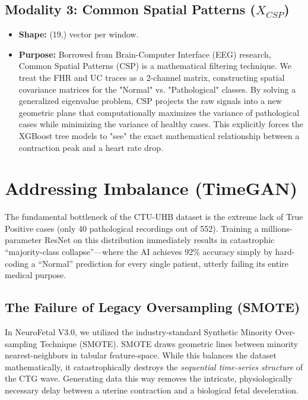 \documentclass[12pt,a4paper]{report}
\begin{document}
\section{Modality 3: Common Spatial Patterns ($X_{CSP}$)}
\begin{itemize}
    \item \textbf{Shape:} (19,) vector per window.
    \item \textbf{Purpose:} Borrowed from Brain-Computer Interface (EEG) research, Common Spatial Patterns (CSP) is a mathematical filtering technique. We treat the FHR and UC traces as a 2-channel matrix, constructing spatial covariance matrices for the "Normal" vs. "Pathological" classes. By solving a generalized eigenvalue problem, CSP projects the raw signals into a new geometric plane that computationally maximizes the variance of pathological cases while minimizing the variance of healthy cases. This explicitly forces the XGBoost tree models to "see" the exact mathematical relationship between a contraction peak and a heart rate drop.
\end{itemize}

\chapter{Addressing Imbalance (TimeGAN)}
The fundamental bottleneck of the CTU-UHB dataset is the extreme lack of True Positive cases (only 40 pathological recordings out of 552). Training a millions-parameter ResNet on this distribution immediately results in catastrophic ``majority-class collapse''---where the AI achieves 92\% accuracy simply by hard-coding a ``Normal'' prediction for every single patient, utterly failing its entire medical purpose.

\section{The Failure of Legacy Oversampling (SMOTE)}
In NeuroFetal V3.0, we utilized the industry-standard Synthetic Minority Over-sampling Technique (SMOTE). SMOTE draws geometric lines between minority nearest-neighbors in tabular feature-space. While this balances the dataset mathematically, it catastrophically destroys the \textit{sequential time-series structure} of the CTG wave. Generating data this way removes the intricate, physiologically necessary delay between a uterine contraction and a biological fetal deceleration.
\end{document}
